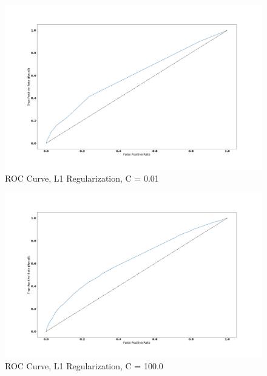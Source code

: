 \documentclass[sigconf]{acmart}
\begin{document}
\begin{figure}[!ht]
  \centering\includegraphics[width=\columnwidth]{images/roc_curve_001.png}
  \caption{ROC Curve, L1 Regularization, C = 0.01}\label{f:roc_curve_001}
\end{figure}

\begin{figure}[!ht]
  \centering\includegraphics[width=\columnwidth]{images/roc_curve_100.png}
  \caption{ROC Curve, L1 Regularization, C = 100.0}\label{f:roc_curve_100}
\end{figure}

\appendix
\end{document}
